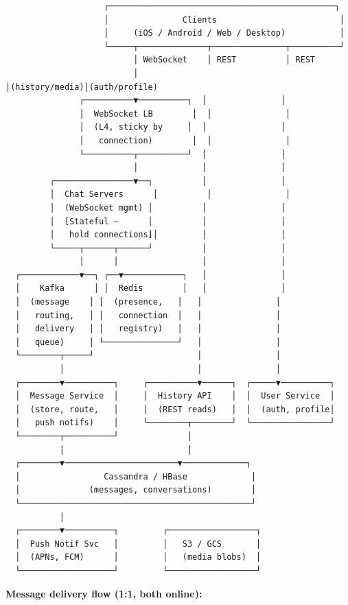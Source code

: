 \documentclass[11pt]{article}
\begin{document}
\begin{verbatim}
                    ┌──────────────────────────────────────────────┐
                    │               Clients                         │
                    │     (iOS / Android / Web / Desktop)           │
                    └─────┬──────────────┬───────────────┬──────────┘
                          │ WebSocket    │ REST          │ REST
                          │             │(history/media)│(auth/profile)
               ┌──────────▼──────────┐  │               │
               │  WebSocket LB        │  │               │
               │  (L4, sticky by     │  │               │
               │   connection)        │  │               │
               └──────────┬──────────┘  │               │
                          │             │               │
         ┌────────────────▼──┐          │               │
         │  Chat Servers      │          │               │
         │  (WebSocket mgmt) │          │               │
         │  [Stateful —      │          │               │
         │   hold connections]│         │               │
         └─────┬──────┬──────┘          │               │
               │      │                 │               │
  ┌────────────▼──┐ ┌──▼────────────┐   │               │
  │    Kafka      │ │  Redis        │   │               │
  │  (message    │ │  (presence,   │   │               │
  │   routing,   │ │   connection  │   │               │
  │   delivery   │ │   registry)   │   │               │
  │   queue)     │ └───────────────┘   │               │
  └────────┬─────┘                     │               │
           │                           │               │
  ┌────────▼──────────┐     ┌──────────▼──────┐  ┌─────▼──────────┐
  │  Message Service  │     │  History API    │  │  User Service  │
  │  (store, route,   │     │  (REST reads)   │  │  (auth, profile│
  │   push notifs)    │     └────────┬────────┘  └────────────────┘
  └────────┬──────────┘              │
           │                         │
  ┌────────▼───────────────────────▼─────────────┐
  │                 Cassandra / HBase             │
  │              (messages, conversations)        │
  └───────────────────────────────────────────────┘
           │
  ┌────────▼──────────┐         ┌──────────────────┐
  │  Push Notif Svc   │         │   S3 / GCS       │
  │  (APNs, FCM)      │         │   (media blobs)  │
  └───────────────────┘         └──────────────────┘
\end{verbatim}

\textbf{Message delivery flow (1:1, both online):}
\end{document}
